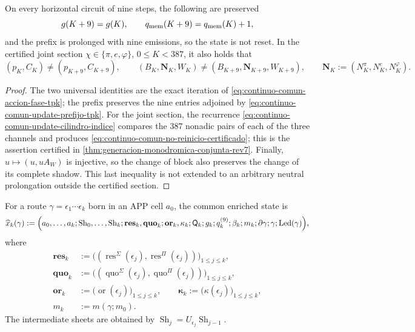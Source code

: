 \begin{proposition}
\label{prop:continuo-comun-no-reinicio-alcance}
On every horizontal circuit of nine steps, the following are preserved
\[
 g(K+9)=g(K),\qquad
 q_{\rm mem}(K+9)=q_{\rm mem}(K)+1,
\]
and the prefix is prolonged with nine emissions, so the state is not
reset. In the certified joint section
\(\chi\in\{\pi,e,\varphi\}\), \(0\leq K<387\), it also holds that
\begin{equation}
\label{eq:continuo-comun-no-reinicio-certificado}
 (p_K,C_K)\neq(p_{K+9},C_{K+9}),\qquad
 (B_K,\mathbf N_K,W_K)\neq
 (B_{K+9},\mathbf N_{K+9},W_{K+9}),
 \qquad
 \mathbf N_K:=(N_K^\pi,N_K^e,N_K^\varphi).
\end{equation}
\end{proposition}

\begin{proof}
The two universal identities are the exact iteration of
\eqref{eq:continuo-comun-accion-fase-tpk}; the prefix preserves the nine
entries adjoined by \eqref{eq:continuo-comun-update-prefijo-tpk}. For the
joint section, the recurrence
\eqref{eq:continuo-comun-update-cilindro-indice} compares the \(387\) nonadic pairs
of each of the three channels and produces
\eqref{eq:continuo-comun-no-reinicio-certificado}; this is the assertion
certified in
\cref{thm:generacion-monodromica-conjunta-rev7}. Finally,
\(u\mapsto(u,uA_W)\) is injective, so the change of block also preserves
the change of its complete shadow. This last inequality is not extended
to an arbitrary neutral prolongation outside the certified
section.
\end{proof}

\begin{definition}
\label{def:continuo-comun-estado}
For a route \(\gamma=\epsilon_1\cdots\epsilon_k\) born in an APP
cell \(a_0\), the common enriched state is
\begin{equation}
\label{eq:continuo-comun-estado}
 \widehat x_k(\gamma):=\Bigl(
  a_0,\ldots,a_k;
  \operatorname{Sh}_0,\ldots,\operatorname{Sh}_k;
  \mathbf{res}_k,\mathbf{quo}_k;
  \mathbf{or}_k,\mathbf\kappa_k;
  \mathsf Q_k;g_k;q^{(9)}_k;\beta_k;m_k;\partial\gamma;\gamma;
  \operatorname{Led}(\gamma)
 \Bigr),
\end{equation}
where
\begin{align*}
 \mathbf{res}_k
 &:=\bigl(
  (\operatorname{res}^{\Sigma}(\epsilon_j),
   \operatorname{res}^{\Pi}(\epsilon_j))
  \bigr)_{1\leq j\leq k},\\
 \mathbf{quo}_k
 &:=\bigl(
  (\operatorname{quo}^{\Sigma}(\epsilon_j),
   \operatorname{quo}^{\Pi}(\epsilon_j))
  \bigr)_{1\leq j\leq k},\\
 \mathbf{or}_k
 &:=\bigl(\operatorname{or}(\epsilon_j)\bigr)_{1\leq j\leq k},
 \qquad
 \mathbf\kappa_k
 :=\bigl(\kappa(\epsilon_j)\bigr)_{1\leq j\leq k},\\
 m_k&:=m(\gamma;m_0).
\end{align*}
The intermediate sheets are obtained by
\(\operatorname{Sh}_{j}=U_{\epsilon_j}\operatorname{Sh}_{j-1}\).
\end{definition}

